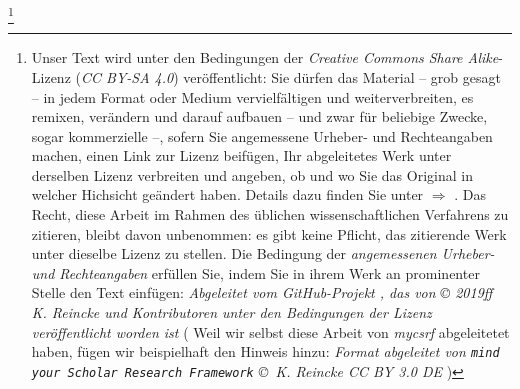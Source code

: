 %
%
%
\footnote{\small Unser Text wird unter den Bedingungen der \textit{Creative Commons Share Alike}-Lizenz (\textit{CC BY-SA 4.0}) ver\-öffentlicht: Sie dürfen das Material -- grob gesagt -- in jedem Format oder Medium vervielfältigen und weiterverbreiten, es remixen, verändern und darauf aufbauen -- und zwar für beliebige Zwecke, sogar kommerzielle --, sofern Sie angemessene Urheber- und Rechteangaben machen, einen Link zur Lizenz beifügen, Ihr abgeleitetes Werk unter derselben Lizenz verbreiten und angeben, ob und wo Sie das Original in welcher Hichsicht geändert haben. Details dazu finden Sie unter $\Rightarrow$ .\newline
Das Recht, diese Arbeit im Rahmen des üblichen wissenschaftlichen Verfahrens zu zitieren, bleibt davon unbenommen: es gibt keine Pflicht, das zitierende Werk unter dieselbe Lizenz zu stellen. Die Bedingung der \textit{an\-ge\-mes\-se\-nen Urheber- und Rechteangaben} erfüllen Sie, indem Sie in ihrem Werk an prominenter Stelle den Text einfügen: {\itshape Abgeleitet vom GitHub-Projekt , das von © 2019ff K. Reincke und Kontributoren unter den Bedingungen der Lizenz  veröffentlicht worden ist }\newline
( {\footnotesize Weil wir selbst diese Arbeit von \textit{mycsrf} abgeleitetet haben, fügen wir beispielhaft den Hinweis hinzu: {\itshape Format abgeleitet von \texttt{mind your Scholar Research Framework} \copyright\ K. Reincke CC BY 3.0 DE  }} ) }
